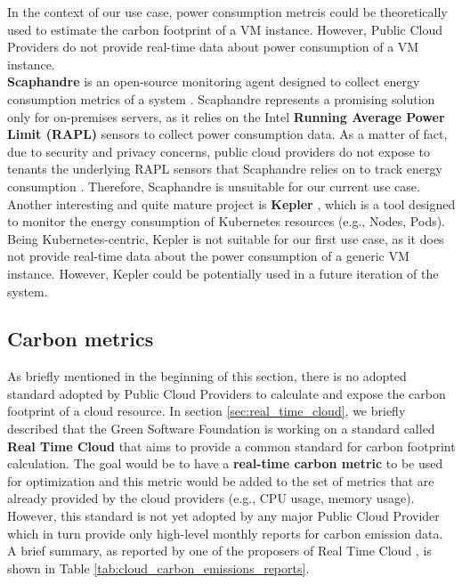 In the context of our use case, power consumption metrcis could be theoretically used to estimate the carbon footprint of a VM instance.
However, Public Cloud Providers do not provide real-time data about power consumption of a VM instance. \\

\textbf{Scaphandre} is an open-source monitoring agent designed to collect energy consumption metrics of a system \cite{scaphandre}.
Scaphandre represents a promising solution only for on-premises servers, as it relies on the Intel \textbf{Running Average Power Limit (RAPL)} sensors to collect power consumption data.
As a matter of fact, due to security and privacy concerns, public cloud providers do not expose to tenants the underlying RAPL sensors that Scaphandre relies on to track energy consumption \cite{scaphandre_github_issue}.
Therefore, Scaphandre is unsuitable for our current use case.
Another interesting and quite mature project is \textbf{Kepler} \cite{kepler}, which is a tool designed to monitor the energy consumption of Kubernetes resources (e.g., Nodes, Pods).
Being Kubernetes-centric, Kepler is not suitable for our first use case, as it does not provide real-time data about the power consumption of a generic VM instance.
However, Kepler could be potentially used in a future iteration of the system.


\subsection{Carbon metrics}
\label{sec:carbon_metrics}

As briefly mentioned in the beginning of this section, there is no adopted standard adopted by Public Cloud Providers to calculate and expose the carbon footprint of a cloud resource.
In section \ref{sec:real_time_cloud}, we briefly described that the Green Software Foundation is working on a standard called \textbf{Real Time Cloud} that aims to provide a common standard for carbon footprint calculation.
The goal would be to have a \textbf{real-time carbon metric} to be used for optimization and this metric would be added to the set of metrics that are already provided by the cloud providers (e.g., CPU usage, memory usage).
However, this standard is not yet adopted by any major Public Cloud Provider which in turn provide only high-level monthly reports for carbon emission data.
A brief summary, as reported by one of the proposers of Real Time Cloud \cite{cloud_provider_sustainability_reports}, is shown in Table \ref{tab:cloud_carbon_emissions_reports}.


